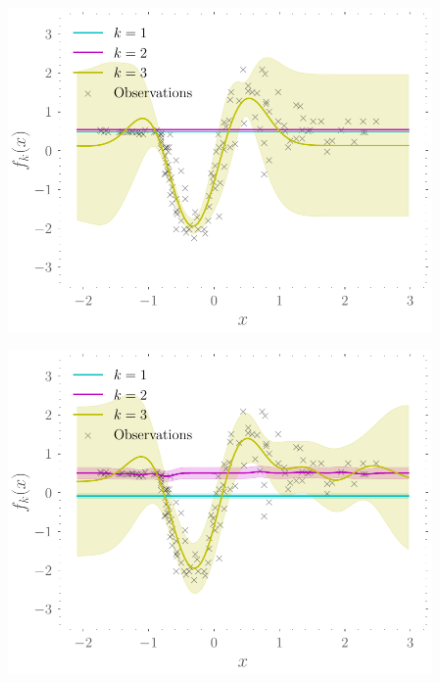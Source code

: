 \documentclass{mimosis-class/mimosis}
\numberwithin{equation}{chapter}
\begin{document}
{\begin{figure}[hbt!]
\centering
\begin{minipage}[r]{0.49\textwidth}
\centering
\includegraphics[width=\textwidth]{./images/model/mcycle/K=3_L2/experts_f.pdf}
\label{fig-expert-gps-mcycle-three-experts-tight}
\end{minipage}
\begin{minipage}[r]{0.49\textwidth}
\centering
\includegraphics[width=\textwidth]{./images/model/mcycle/K=3_L3/experts_f.pdf}
\label{fig-expert-gps-mcycle-three-experts-further}
\end{minipage}

\end{figure}}
\end{document}
